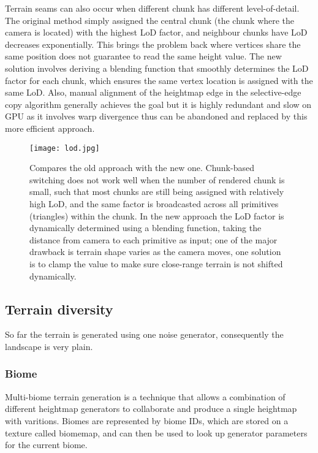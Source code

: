 \documentclass[oneside, a4paper]{article}
\begin{document}
    Terrain seams can also occur when different chunk has different level-of-detail. The original method simply assigned the central chunk (the chunk where the camera is located) with the highest LoD factor, and neighbour chunks have LoD decreases exponentially. This brings the problem back where vertices share the same position does not guarantee to read the same height value. The new solution involves deriving a blending function that smoothly determines the LoD factor for each chunk, which ensures the same vertex location is assigned with the same LoD. Also, manual alignment of the heightmap edge in the selective-edge copy algorithm generally achieves the goal but it is highly redundant and slow on GPU as it involves warp divergence thus can be abandoned and replaced by this more efficient approach.

    \begin{figure}[H]
        \texttt{[image: lod.jpg]}
        \caption{Compares the old approach with the new one. Chunk-based switching does not work well when the number of rendered chunk is small, such that most chunks are still being assigned with relatively high LoD, and the same factor is broadcasted across all primitives (triangles) within the chunk. In the new approach the LoD factor is dynamically determined using a blending function, taking the distance from camera to each primitive as input; one of the major drawback is terrain shape varies as the camera moves, one solution is to clamp the value to make sure close-range terrain is not shifted dynamically.}
    \end{figure}

    \subsection{Terrain diversity}

    So far the terrain is generated using one noise generator, consequently the landscape is very plain.

    \subsubsection{Biome}

    Multi-biome terrain generation is a technique that allows a combination of different heightmap generators to collaborate and produce a single heightmap with varitions. Biomes are represented by biome IDs, which are stored on a texture called biomemap, and can then be used to look up generator parameters for the current biome.
\end{document}
